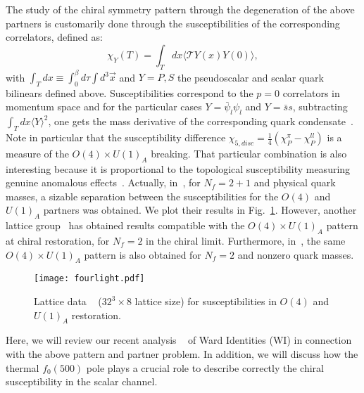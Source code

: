 \documentclass{PoS}
\newcommand{\intT}{\int_0^\beta d\tau \int d^3 \vec{x}}
\begin{document}
The study of the chiral symmetry pattern through the degeneration of the above partners is customarily done through the susceptibilities of the corresponding correlators, defined as:
\begin{equation}
 \chi_Y(T)=\int_T dx  \langle \mathcal{T} Y(x) Y (0) \rangle,
\end{equation}
with $\int_T dx\equiv\intT$ and $Y=P,S$ the pseudoscalar and scalar quark bilinears defined above. 
Susceptibilities correspond to the $p=0$ correlators in momentum space and for the particular cases $Y=\bar \psi_l\psi_l$ and $Y=\bar s s$,  subtracting  $\int_T dx \langle Y\rangle^2$, 
one gets the mass derivative of the corresponding quark condensate~\cite{GomezNicola:2012uc}. 
Note in particular that the susceptibility difference $\chi_{5,disc}=\frac{1}{4}\left(\chi_P^\pi-\chi_P^{ll}\right)$ is a measure of the $O(4)\times U(1)_A$ breaking. That particular combination is also interesting because it is proportional to the topological susceptibility measuring genuine anomalous effects~\cite{Buchoff:2013nra}.  Actually, 
in~\cite{Buchoff:2013nra}, for $N_f=2+1$ and physical quark masses, a sizable separation between the susceptibilities for the $O(4)$ and $U(1)_A$ partners was obtained. 
We plot their results in Fig.~\ref{fig:latticenonet}. However, another lattice group~\cite{Aoki:2012yj,Cossu:2013uua,Tomiya:2016jwr} has obtained results compatible with the $O(4)\times U(1)_A$ pattern at chiral restoration, for $N_f=2$ in the chiral limit. Furthermore, in~\cite{Brandt:2016daq}, the  same $O(4)\times U(1)_A$ pattern is also obtained for $N_f=2$ and nonzero quark masses. 
\begin{figure}
\centerline{\texttt{[image: fourlight.pdf]}}
\caption{Lattice data ~\cite{Buchoff:2013nra} ($32^3\times 8$ lattice size) for  susceptibilities  in  $O(4)$ and $U(1)_A$ restoration.}
\label{fig:latticenonet}
\end{figure}

Here, we will review our recent analysis ~\cite{Nicola:2016jlj,GomezNicola:2017bhm} of Ward Identities (WI) in connection with the above pattern and partner problem. In addition, we will discuss how the thermal $f_0(500)$ pole plays a crucial role to describe correctly the  chiral susceptibility in the scalar channel. 
\end{document}
